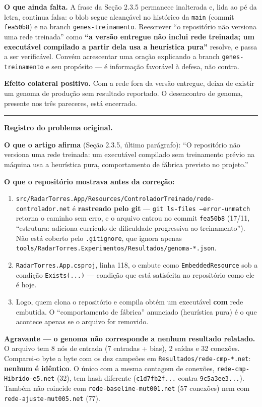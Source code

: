 \documentclass[11pt,a4paper]{article}
\begin{document}
\textbf{O que ainda falta.} A frase da Seção 2.3.5 permanece inalterada e, lida ao pé da letra,
continua falsa: o blob segue alcançável no histórico da \texttt{main} (commit \texttt{fea50b8}) e na
branch \texttt{genes-treinamento}. Reescrever ``o repositório não versiona uma rede treinada'' como
\textbf{``a versão entregue não inclui rede treinada; um executável compilado a partir dela usa a
heurística pura''} resolve, e passa a ser verificável. Convém acrescentar uma oração explicando a
branch \texttt{genes-treinamento} e seu propósito --- é informação favorável à defesa, não contra.

\textbf{Efeito colateral positivo.} Com a rede fora da versão entregue, deixa de existir um genoma de
produção sem resultado reportado. O desencontro de genoma, presente nos três pareceres, está
encerrado.

\medskip
\hrule
\medskip

\textbf{Registro do problema original.}

\textbf{O que o artigo afirma} (Seção 2.3.5, último parágrafo): ``O repositório não versiona uma rede
treinada: um executável compilado sem treinamento prévio na máquina usa a heurística pura,
comportamento de fábrica previsto no projeto.''

\textbf{O que o repositório mostrava antes da correção:}

\begin{enumerate}
  \item \texttt{src/RadarTorres.App/Resources/ControladorTreinado/rede-controlador.net} é
  \textbf{rastreado pelo git} --- \texttt{git ls-files --error-unmatch} retorna o caminho sem erro, e
  o arquivo entrou no commit \texttt{fea50b8} (17/11, ``estrutura: adiciona currículo de dificuldade
  progressiva ao treinamento''). Não está coberto pelo \texttt{.gitignore}, que ignora apenas
  \texttt{tools/RadarTorres.Experimentos/Resultados/genoma-*.json}.
  \item \texttt{RadarTorres.App.csproj}, linha 118, o embute como \texttt{EmbeddedResource} sob a
  condição \texttt{Exists(...)} --- condição que está satisfeita no repositório como ele é hoje.
  \item Logo, quem clona o repositório e compila obtém um executável \textbf{com} rede embutida. O
  ``comportamento de fábrica'' anunciado (heurística pura) é o que acontece apenas se o arquivo for
  removido.
\end{enumerate}

\textbf{Agravante --- o genoma não corresponde a nenhum resultado relatado.} O arquivo tem 8 nós de
entrada (7 entradas + bias), 2 saídas e 32 conexões. Comparei-o byte a byte com os dez campeões em
\texttt{Resultados/rede-cmp-*.net}: \textbf{nenhum é idêntico}. O único com a mesma contagem de
conexões, \texttt{rede-cmp-Hibrido-e5.net} (32), tem hash diferente
(\texttt{c1d7fb2f...} contra \texttt{9c5a3ee3...}). Também não coincide com
\texttt{rede-baseline-mut001.net} (57 conexões) nem com \texttt{rede-ajuste-mut005.net} (77).
\end{document}
